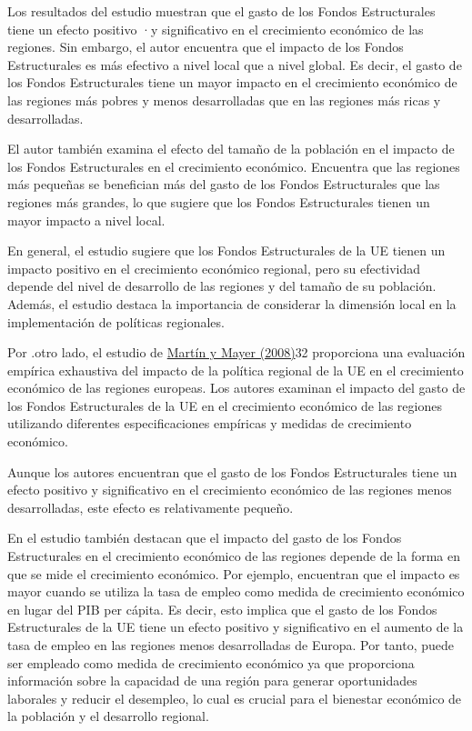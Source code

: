 \documentclass[10pt,a4paper]{article}
\begin{document}
Los resultados del estudio muestran que el gasto de los Fondos Estructurales tiene un efecto positivo ·y significativo en el crecimiento económico de las regiones. Sin embargo, el autor encuentra que el impacto de los Fondos Estructurales es más efectivo a nivel local que a nivel global. Es decir, el gasto de los Fondos Estructurales tiene un mayor impacto en el crecimiento económico de las regiones más pobres y menos desarrolladas que en las regiones más ricas y desarrolladas.

El autor también examina el efecto del tamaño de la población en el impacto de los Fondos Estructurales en el crecimiento económico. Encuentra que las regiones más pequeñas se benefician más del gasto de los Fondos Estructurales que las regiones más grandes, lo que sugiere que los Fondos Estructurales tienen un mayor impacto a nivel local.

En general, el estudio sugiere que los Fondos Estructurales de la UE tienen un impacto positivo en el crecimiento económico regional, pero su efectividad depende del nivel de desarrollo de las regiones y del tamaño de su población. Además, el estudio destaca la importancia de considerar la dimensión local en la implementación de políticas regionales.

Por .otro lado, el estudio de \href{https://www.econstor.eu/handle/10419/120209}{Martín y Mayer (2008)}32 proporciona una evaluación empírica exhaustiva del impacto de la política regional de la UE en el crecimiento económico de las regiones europeas. Los autores examinan el impacto del gasto de los Fondos Estructurales de la UE en el crecimiento económico de las regiones utilizando diferentes especificaciones empíricas y medidas de crecimiento económico.

Aunque los autores encuentran que el gasto de los Fondos Estructurales tiene un efecto positivo y significativo en el crecimiento económico de las regiones menos desarrolladas, este efecto es relativamente pequeño.

En el estudio también destacan que el impacto del gasto de los Fondos Estructurales en el crecimiento económico de las regiones depende de la forma en que se mide el crecimiento económico. Por ejemplo, encuentran que el impacto es mayor cuando se utiliza la tasa de empleo como medida de crecimiento económico en lugar del PIB per cápita. Es decir, esto implica que el gasto de los Fondos Estructurales de la UE tiene un efecto positivo y significativo en el aumento de la tasa de empleo en las regiones menos desarrolladas de Europa. Por tanto, puede ser empleado como medida de crecimiento económico ya que proporciona información sobre la capacidad de una región para generar oportunidades laborales y reducir el desempleo, lo cual es crucial para el bienestar económico de la población y el desarrollo regional.
\end{document}
